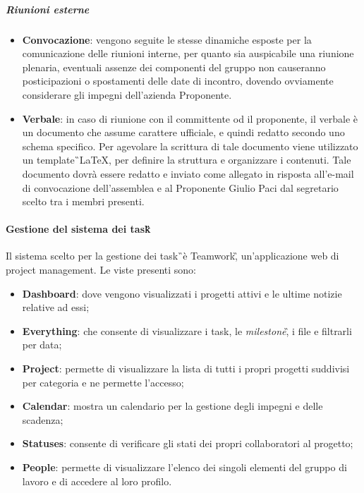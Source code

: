 \subparagraph{Riunioni esterne}
\begin{itemize}
\item \textbf{Convocazione}: vengono seguite le stesse dinamiche esposte per la comunicazione delle riunioni 
interne, per quanto sia auspicabile una riunione plenaria, eventuali assenze 
dei componenti del gruppo non causeranno posticipazioni o spostamenti delle 
date di incontro, dovendo ovviamente considerare gli impegni dell'azienda 
Proponente.

\item \textbf{Verbale}: in caso di riunione con il committente od il proponente, il verbale è un 
documento che assume carattere ufficiale, e quindi redatto secondo uno schema 
specifico.
Per agevolare la scrittura di tale documento viene utilizzato un template\G\ 
\LaTeX, per definire la struttura e organizzare i contenuti. Tale documento 
dovrà essere redatto e inviato come allegato in risposta all'e-mail di convocazione 
dell'assemblea e al Proponente Giulio Paci dal segretario scelto tra i membri presenti. 
\end{itemize}


\paragraph{Gestione del sistema dei task\G} Il sistema scelto per la gestione dei task\G\ è Teamwork\G, un'applicazione web di project management. Le viste presenti sono:
\begin{itemize}
\item \textbf{Dashboard}: dove vengono visualizzati i progetti attivi e le ultime notizie relative ad essi;

\item \textbf{Everything}: che consente di visualizzare i task, le \textit{milestone}\G, i file e filtrarli per data;

\item \textbf{Project}: permette di visualizzare la lista di tutti i propri progetti suddivisi per categoria e ne permette l'accesso;

\item \textbf{Calendar}: mostra un calendario per la gestione degli impegni e delle scadenza;

\item \textbf{Statuses}: consente di verificare gli stati dei propri collaboratori al progetto;

\item \textbf{People}: permette di visualizzare l'elenco dei singoli elementi del gruppo di lavoro e di accedere al loro profilo.    
\end{itemize}

